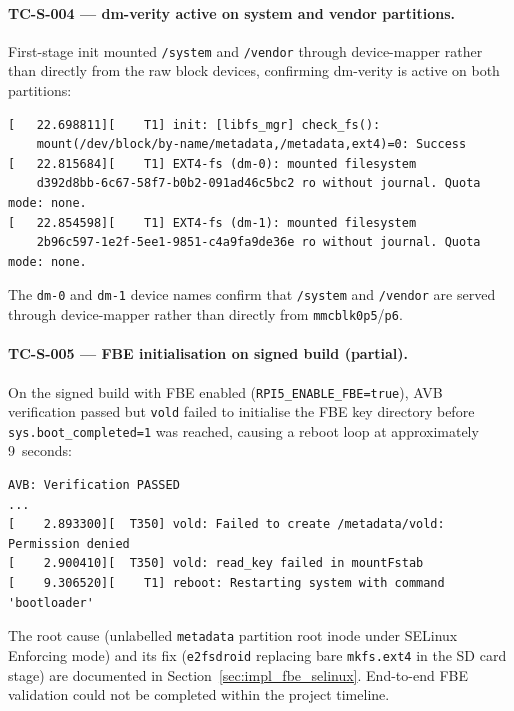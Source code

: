 \paragraph{TC-S-004 --- dm-verity active on system and vendor partitions.}
First-stage init mounted \texttt{/system} and \texttt{/vendor} through device-mapper rather than directly from the raw block devices, confirming dm-verity is active on both partitions:

\begin{lstlisting}[caption={TC-S-004: First-stage init dm-verity mount messages (abbreviated)}]
[   22.698811][    T1] init: [libfs_mgr] check_fs():
    mount(/dev/block/by-name/metadata,/metadata,ext4)=0: Success
[   22.815684][    T1] EXT4-fs (dm-0): mounted filesystem
    d392d8bb-6c67-58f7-b0b2-091ad46c5bc2 ro without journal. Quota mode: none.
[   22.854598][    T1] EXT4-fs (dm-1): mounted filesystem
    2b96c597-1e2f-5ee1-9851-c4a9fa9de36e ro without journal. Quota mode: none.
\end{lstlisting}

The \texttt{dm-0} and \texttt{dm-1} device names confirm that \texttt{/system} and \texttt{/vendor} are served through device-mapper rather than directly from \texttt{mmcblk0p5}/\texttt{p6}.

\paragraph{TC-S-005 --- FBE initialisation on signed build (partial).}
On the signed build with FBE enabled (\texttt{RPI5\_ENABLE\_FBE=true}), AVB verification passed but \texttt{vold} failed to initialise the FBE key directory before \texttt{sys.boot\_completed=1} was reached, causing a reboot loop at approximately 9~seconds:

\begin{lstlisting}[caption={TC-S-005: FBE boot loop on signed build}]
AVB: Verification PASSED
...
[    2.893300][  T350] vold: Failed to create /metadata/vold: Permission denied
[    2.900410][  T350] vold: read_key failed in mountFstab
[    9.306520][    T1] reboot: Restarting system with command 'bootloader'
\end{lstlisting}

The root cause (unlabelled \texttt{metadata} partition root inode under SELinux Enforcing mode) and its fix (\texttt{e2fsdroid} replacing bare \texttt{mkfs.ext4} in the SD card stage) are documented in Section~\ref{sec:impl_fbe_selinux}.  End-to-end FBE validation could not be completed within the project timeline.

